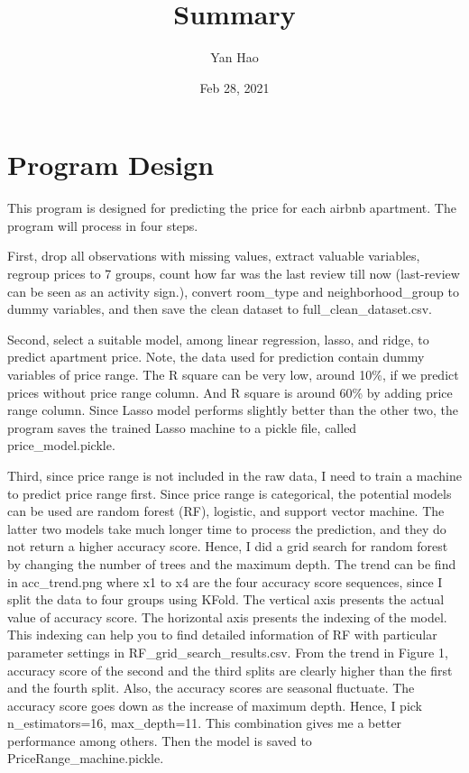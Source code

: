 \documentclass[12pt]{article}
\title{Summary}
\author{Yan Hao}
\date{Feb 28, 2021}
\begin{document}
\maketitle
\newpage




\section{Program Design}

This program is designed for predicting the price for each airbnb apartment.
The program will process in four steps.

First, drop all observations with missing values, extract
valuable variables, regroup prices to 7 groups, count how far was the last
review till now (last-review can be seen as an activity sign.), 
convert room\_type and neighborhood\_group to dummy variables, and then save
the clean dataset to full\_clean\_dataset.csv. 

Second, select a suitable model, among linear regression, lasso, and ridge,
to predict apartment price. Note, the data used for prediction contain dummy
variables of price range. The R square can be very low, around 10\%, if we
predict prices without price range column. And R square is around 60\% by adding
price range column. Since Lasso model performs slightly better than the other
two, the program saves the trained Lasso machine to a pickle file, called
price\_model.pickle.

Third, since price range is not included in the raw data, I need to train a 
machine to predict price range first. Since price range is categorical, the
potential models can be used are random forest (RF), logistic, and support vector
machine. The latter two models take much longer time to process the prediction, 
and they do not return a higher accuracy score. Hence, I did a grid search for
random forest by changing the number of trees and the maximum depth. 
The trend can be find in acc\_trend.png where x1 to x4 are the four accuracy score 
sequences, since I split the data to four groups using KFold. The vertical
axis presents the actual value of accuracy score. The horizontal axis presents the
indexing of the model. This indexing can help you to find detailed information
of RF with particular parameter settings in RF\_grid\_search\_results.csv.
From the trend in Figure 1, accuracy score of the second and the third splits are 
clearly higher than the first and the fourth split. Also, the accuracy scores are
seasonal fluctuate. The accuracy score goes down as the increase of maximum 
depth. Hence, I pick n\_estimators=16, max\_depth=11. This combination gives me
a better performance among others. Then the model is saved to 
PriceRange\_machine.pickle. 
\end{document}
